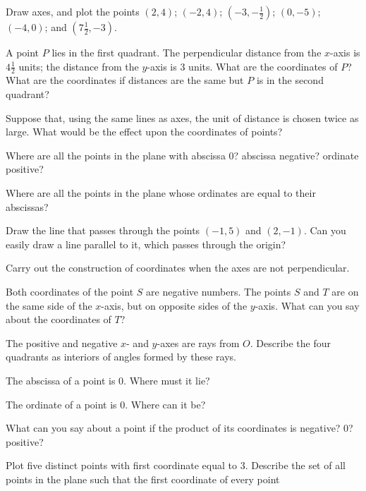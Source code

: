 \documentclass[11pt]{book}
\theoremstyle{bkplain}
\begin{document}
\begin{exercisecols}
\begin{exlist}
\item Draw axes, and plot the points $(2, 4)$; $(-2, 4)$;
  $(-3, -\tfrac{1}{2})$; $(0, -5)$; $(-4, 0)$; and $(7\tfrac{1}{2}, -3)$.
\item A point $P$ lies in the first quadrant. The perpendicular distance from
  the $x$-axis is $4\tfrac{1}{2}$ units; the distance from the $y$-axis is 3
  units. What are the coordinates of $P$? What are the coordinates if
  distances are the same but $P$ is in the second quadrant?
\item[\stex 3.] Suppose that, using the same lines as axes, the unit of
  distance is chosen twice as large. What would be the effect upon the
  coordinates of points?
\item[\stex 4.] Where are all the points in the plane with abscissa 0?
  abscissa negative? ordinate positive?
\item[\stex 5.] Where are all the points in the plane whose ordinates are
  equal to their abscissas?
\item[6.] Draw the line that passes through the points $(-1, 5)$ and
  $(2, -1)$. Can you easily draw a line parallel to it, which passes through
  the origin?
\item[\stex 7.] Carry out the construction of coordinates when the axes are
  not perpendicular.
\item[8.] Both coordinates of the point $S$ are negative numbers. The points
  $S$ and $T$ are on the same side of the $x$-axis, but on opposite sides of
  the $y$-axis. What can you say about the coordinates of $T$?
\setcounter{exlisti}{8}
\item The positive and negative $x$- and $y$-axes are rays from $O$. Describe
  the four quadrants as interiors of angles formed by these rays.
\item The abscissa of a point is 0. Where must it lie?
\item The ordinate of a point is 0. Where can it be?
\item What can you say about a point if the product of its coordinates is
  negative? 0? positive?
\item Plot five distinct points with first coordinate equal to 3. Describe the
  set of all points in the plane such that the first coordinate of every point

\end{exlist}
\end{exercisecols}
\end{document}
